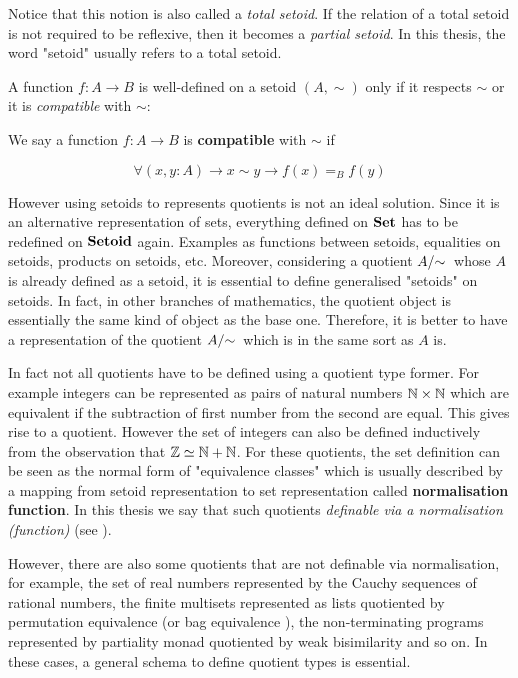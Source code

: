 Notice that this notion is also called a \emph{total setoid}. If the relation of a total setoid is not required to be reflexive, then it becomes a \emph{partial setoid}. In this thesis, the word "setoid" usually refers to a total setoid.


A function $f : A \to B$ is well-defined on a setoid $(A,\sim)$ only if it respects $\sim$ or it is \emph{compatible} with $\sim$:

\begin{definition}\label{compatible}
We say a function $f : A \to B$ is \textbf{compatible} with $\sim$ if

$$\forall (x, y : A) \to x \sim y \to f(x) =_{B} f(y)$$
\end{definition}

However using setoids to represents quotients is not an ideal solution. Since it is an alternative representation of sets, everything defined on $\operatorname{\mathbf{Set}}$ has to be redefined on $\operatorname{\mathbf{Setoid}}$ again. 
Examples as functions between setoids, equalities on setoids,
products on setoids, etc. Moreover, considering a quotient $\qset{A}$ whose $A$ is already defined as a setoid, it is essential to define generalised "setoids" on setoids.
In fact, in other branches of mathematics, the quotient object is essentially the same kind of object as the base one.
Therefore, it is better to have a representation of the quotient $\qset{A}$ which is in the same sort as $A$ is. 

In fact not all quotients have to be defined using a quotient type former. For example integers can be represented as pairs of natural numbers $\mathbb{N} \times \mathbb{N}$ which are equivalent if the subtraction of first number from the second are equal. This gives rise to a quotient. However the set of integers can also be defined inductively from the observation that $\mathbb{Z} \simeq \mathbb{N} + \mathbb{N}$.
For these quotients, the set definition can be seen as the normal form of "equivalence classes" which is usually described by a mapping from setoid representation to set representation called \textbf{normalisation function}. In this thesis we say that such quotients \emph{definable via a normalisation (function)} (see ).


However, there are also some quotients that are not definable via normalisation, for example, the set of real numbers represented by the Cauchy sequences of rational numbers, the finite multisets represented as lists quotiented by permutation equivalence (or bag equivalence \cite{DBLP:conf/itp/Danielsson12}), the non-terminating programs represented by partiality monad quotiented by weak bisimilarity and so on. In these cases, a general schema to define quotient types is essential.

